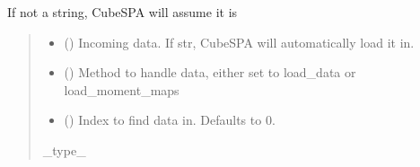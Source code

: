 \documentclass[letterpaper,10pt,english]{sphinxmanual}
\begin{document}
\begin{fulllineitems}
\label{\detokenize{modules:cubespa.data.handle_data}}
\pysigstartsignatures
{}
\pysigstopsignatures\begin{description}
\sphinxAtStartPar
If not a string, CubeSPA will assume it is

\end{description}
\begin{quote}\begin{description}
\begin{itemize}
\item {} 
\sphinxAtStartPar
{} () \textendash{} Incoming data. If str, CubeSPA will automatically load it in.

\item {} 
\sphinxAtStartPar
{} () \textendash{} Method to handle data, either set to load\_data or load\_moment\_maps

\item {} 
\sphinxAtStartPar
{} (\sphinxstyleliteralemphasis{\sphinxupquote{, }}) \textendash{} Index to find data in. Defaults to 0.

\end{itemize}

\sphinxAtStartPar
\_type\_

\end{description}\end{quote}

\end{fulllineitems}


\begin{fulllineitems}
\label{\detokenize{modules:cubespa.data.load_data}}
\pysigstartsignatures
{}
\pysigstopsignatures
\end{fulllineitems}
\end{document}
